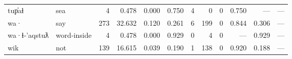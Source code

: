 \begin{landscape}
\begin{longtable}[c]{ l l | r r c c | r r r | r r r }
  tup̓aɬ              & sea                       & 4   & 0.478                     & 0.000           & 0.750      & 4         & 0           & 0            & 0.750     & —           & —\\
  wa·                & say                       & 273 & 32.632                    & 0.120           & 0.261      & 6         & 199         & 0            & 0.844     & 0.306       & —\\
  wa·ɬ‑'aqstuƛ       & word‑inside               & 4   & 0.478                     & 0.000           & 0.929      & 0         & 4           & 0            & —         & 0.929       & —\\
  wik                & not                       & 139 & 16.615                    & 0.039           & 0.190      & 1         & 138         & 0            & 0.920     & 0.188       & —\\

  \bottomrule

\end{longtable}

\end{landscape}
